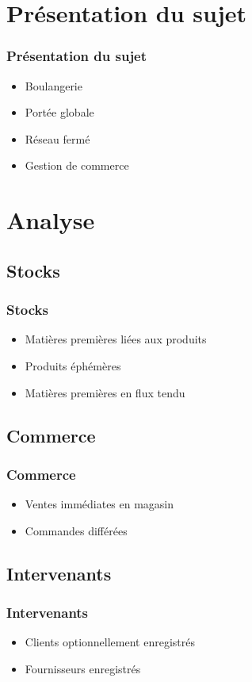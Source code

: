     \section{Présentation du sujet}


\begin{frame}
\frametitle{Présentation du sujet}
\begin{itemize}
    \itemsep2em
    \item Boulangerie
    \item Portée globale
    \item Réseau fermé
    \item Gestion de commerce
\end{itemize}
\end{frame}



    \section{Analyse}


\subsection{Stocks}
\begin{frame}
\frametitle{Stocks}
\begin{itemize}
    \itemsep2em
    \item Matières premières liées aux produits
    \item Produits éphémères
    \item Matières premières en flux tendu %
\end{itemize}
\end{frame}

\subsection{Commerce}
\begin{frame}
\frametitle{Commerce}
\begin{itemize}
    \itemsep2em
    \item Ventes immédiates en magasin
    \item Commandes différées
\end{itemize}
\end{frame}

\subsection{Intervenants}
\begin{frame}
\frametitle{Intervenants}
\begin{itemize}
    \itemsep2em
    \item Clients optionnellement enregistrés
    \item Fournisseurs enregistrés
\end{itemize}
\end{frame}


